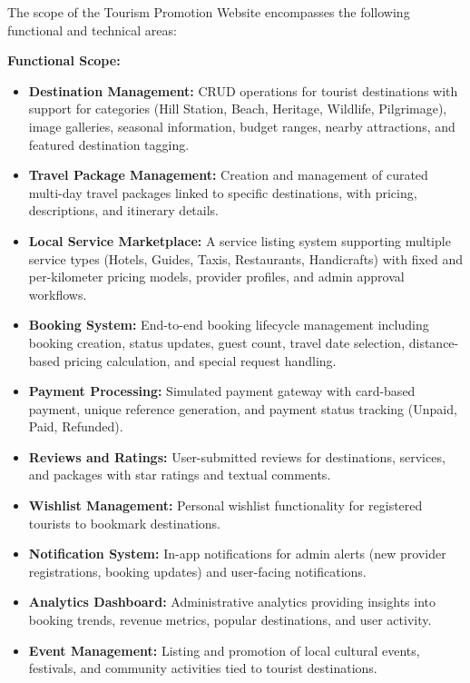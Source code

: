 The scope of the Tourism Promotion Website encompasses the following functional and technical areas:

\textbf{Functional Scope:}
\begin{itemize}[leftmargin=2em]
    \item \textbf{Destination Management:} CRUD operations for tourist destinations with support for categories (Hill Station, Beach, Heritage, Wildlife, Pilgrimage), image galleries, seasonal information, budget ranges, nearby attractions, and featured destination tagging.
    \item \textbf{Travel Package Management:} Creation and management of curated multi-day travel packages linked to specific destinations, with pricing, descriptions, and itinerary details.
    \item \textbf{Local Service Marketplace:} A service listing system supporting multiple service types (Hotels, Guides, Taxis, Restaurants, Handicrafts) with fixed and per-kilometer pricing models, provider profiles, and admin approval workflows.
    \item \textbf{Booking System:} End-to-end booking lifecycle management including booking creation, status updates, guest count, travel date selection, distance-based pricing calculation, and special request handling.
    \item \textbf{Payment Processing:} Simulated payment gateway with card-based payment, unique reference generation, and payment status tracking (Unpaid, Paid, Refunded).
    \item \textbf{Reviews and Ratings:} User-submitted reviews for destinations, services, and packages with star ratings and textual comments.
    \item \textbf{Wishlist Management:} Personal wishlist functionality for registered tourists to bookmark destinations.
    \item \textbf{Notification System:} In-app notifications for admin alerts (new provider registrations, booking updates) and user-facing notifications.
    \item \textbf{Analytics Dashboard:} Administrative analytics providing insights into booking trends, revenue metrics, popular destinations, and user activity.
    \item \textbf{Event Management:} Listing and promotion of local cultural events, festivals, and community activities tied to tourist destinations.
\end{itemize}

